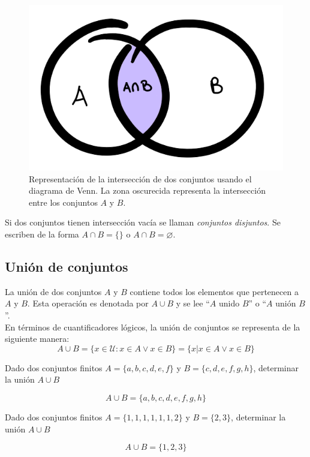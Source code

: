 \begin{center}
	\begin{figure}[ht!]
	\centering
    		\includegraphics[scale=0.35]{FiguresBM/interseccion.png}
    		\caption[Representación de la intersección de dos conjuntos]{Representación de la intersección de dos conjuntos usando el diagrama de Venn. La zona oscurecida representa la intersección entre los conjuntos $A$ y $B$.}
	\end{figure}
\end{center}
Si dos conjuntos tienen intersección vacía se llaman \textit{conjuntos disjuntos}. Se escriben de la forma $A\cap B=\{\}$ o $A\cap B=\varnothing$.
\subsection{Unión de conjuntos}
La unión de dos conjuntos $A$ y $B$ contiene todos los elementos que pertenecen a $A$ y $B$. Esta operación es denotada por $A\cup B$ y se lee ``$A$ unido $B$'' o ``$A$ unión $B$''.\\
En términos de cuantificadores lógicos, la unión de conjuntos se representa de la siguiente manera:
\begin{equation}
A\cup B=\{x\in\mathcal{U}:x\in A\vee x\in B\}=\{x|x\in A\vee x\in B\}
\end{equation}
\begin{myexample}
Dado dos conjuntos finitos $A=\{a,b,c,d,e,f\}$ y $B=\{c,d,e,f,g,h\}$, determinar la unión $A\cup B$
\end{myexample}
\begin{equation*}
A\cup B=\{a,b,c,d,e,f,g,h\}
\end{equation*}
\begin{myexample}
Dado dos conjuntos finitos $A=\{1,1,1,1,1,1,2\}$ y $B=\{2,3\}$, determinar la unión $A\cup B$
\end{myexample}
\begin{equation*}
A\cup B=\{1,2,3\}
\end{equation*}

